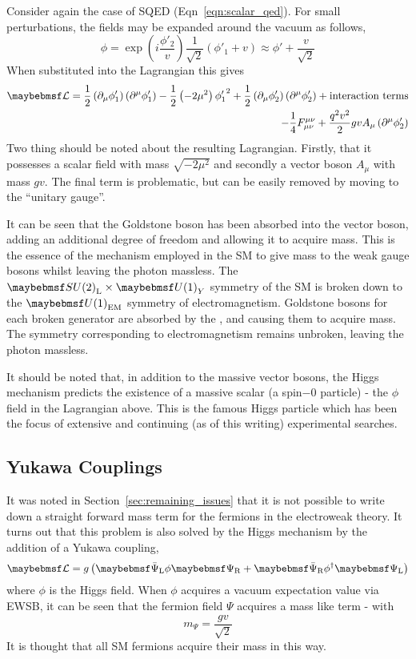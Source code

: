 Consider again the case of \ac{SQED} (Eqn~\ref{eqn:scalar_qed}). For small
perturbations, the fields may be expanded around the vacuum as follows,
\begin{equation}
\phi = \exp\left(i\frac{\phi'_2}{v}\right)\frac{1}{\sqrt{2}}\left(\phi'_1 + v\right) \approx
\phi' + \frac{v}{\sqrt{2}}
\end{equation}
When substituted into the Lagrangian this gives
\begin{align}
  \lagrangiand =
  \frac{1}{2}\left(\partial_{\mu}\phi'_1\right)\left(\partial^{\mu}\phi'_1\right)
  - \frac{1}{2}\left(-2\mu^2\right){\phi'_1}^2 +
  \frac{1}{2}\left(\partial_{\mu}\phi'_2\right)\left(\partial^{\mu}\phi'_2\right)
  + \textrm{interaction terms}\\
  - \frac{1}{4}F_{\mu\nu}^{\mu\nu} +
  \frac{q^2v^2}{2}gvA_{\mu}\left(\partial^{\mu}\phi'_2\right)
\end{align}
Two thing should be noted about the resulting Lagrangian. Firstly, that it
possesses a scalar field with mass $\sqrt{-2\mu^2}$ and secondly a vector
boson $A_{\mu}$ with mass $gv$. The final term is problematic, but can be
easily removed by moving to the ``unitary gauge''.

It can be seen that the Goldstone boson has been absorbed into the vector boson,
adding an additional degree of freedom and allowing it to acquire mass. This is
the essence of the mechanism employed in the \ac{SM} to give mass to the weak
gauge bosons whilst leaving the photon massless. The
$\SUtwo_{\textrm{L}}\times\Uone_{Y}$ symmetry of the \ac{SM} is broken down to
the $\Uone_{\textrm{EM}}$ symmetry of electromagnetism. Goldstone bosons for
each broken generator are absorbed by the \PWp, \PWm and \PZ causing them to
acquire mass. The symmetry corresponding to electromagnetism remains unbroken,
leaving the photon massless.

It should be noted that, in addition to the massive vector bosons, the Higgs
mechanism predicts the existence of a massive scalar (a spin$-0$ particle) - the
$\phi$ field in the Lagrangian above. This is the famous Higgs particle which
has been the focus of extensive and continuing (as of this writing) experimental
searches.

\subsection{Yukawa Couplings}
\label{sec:theory_yukawa}
It was noted in Section~\ref{sec:remaining_issues} that it is not possible to
write down a straight forward mass term for the fermions in the electroweak
theory. It turns out that this problem is also solved by the Higgs mechanism by
the addition of a Yukawa coupling,
\begin{equation}
\lagrangiand = g \left(\APsiL \phi \PsiR + \APsiR\phi^{\dagger}\PsiL\right)
\end{equation}
where $\phi$ is the Higgs field. When $\phi$ acquires a vacuum expectation value
via \ac{EWSB}, it can be seen that the fermion field $\Psi$ acquires a mass like
term - with
\begin{equation}
m_{\Psi} = \frac{gv}{\sqrt{2}}
\end{equation}
It is thought that all \ac{SM} fermions acquire their mass in this way.

